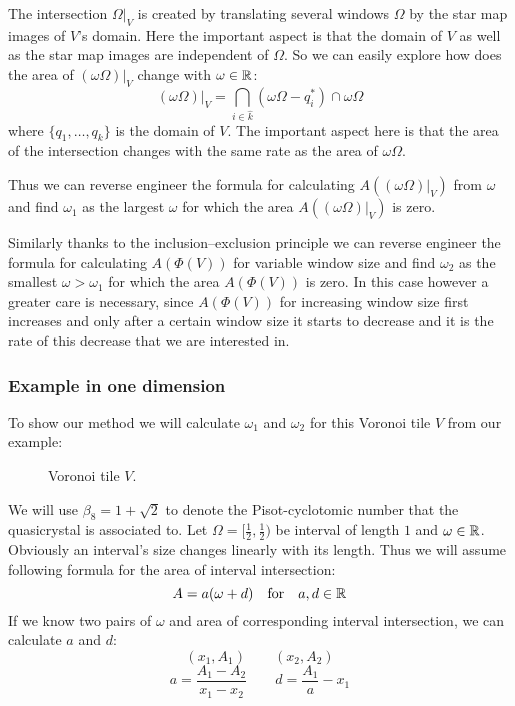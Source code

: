 \documentclass[text.tex]{subfiles}
\begin{document}
The intersection $\Omega|_V$ is created by translating several windows $\Omega$ by the star map images of $V$'s domain. Here the important aspect is that the domain of $V$ as well as the star map images are independent of $\Omega$. So we can easily explore how does the area of $(\omega\Omega)|_V$ change with $\omega\in\mathbb{R}$:
$$(\omega\Omega)|_V = \bigcap\limits_{i\in\hat{k}}(\omega\Omega-q_i^\ast)\cap\omega\Omega$$
where $\{q_1,\dots,q_k\}$ is the domain of $V$. The important aspect here is that the area of the intersection changes with the same rate as the area of $\omega\Omega$. 

Thus we can reverse engineer the formula for calculating $A((\omega\Omega)|_V)$ from $\omega$ and find $\omega_1$ as the largest $\omega$ for which the area $A((\omega\Omega)|_V)$ is zero. 

Similarly thanks to the inclusion--exclusion principle we can reverse engineer the formula for calculating $A(\Phi(V))$ for variable window size and find $\omega_2$ as the smallest $\omega>\omega_1$ for which the area $A(\Phi(V))$ is zero. In this case however a greater care is necessary, since $A(\Phi(V))$ for increasing window size first increases and only after a certain window size it starts to decrease and it is the rate of this decrease that we are interested in. 

\subsubsection{Example in one dimension}
To show our method we will calculate $\omega_1$ and $\omega_2$ for this Voronoi tile $V$ from our example: 
\begin{figure}[h!]
\centering
\caption{Voronoi tile $V$.}
\label{fig_calculatingPeriodExample01}
\end{figure}

We will use $\beta_8 = 1+\sqrt{2}$ to denote the Pisot-cyclotomic number that the quasicrystal is associated to. 
Let $\Omega = [\frac{1}{2}, \frac{1}{2})$ be interval of length $1$ and $\omega\in\mathbb{R}$. Obviously an interval's size changes linearly with its length. Thus we will assume following formula for the area of interval intersection: 
$$A = a(\omega+d) \quad\text{for}\quad a,d\in\mathbb{R}$$
If we know two pairs of $\omega$ and area of corresponding interval intersection, we can calculate $a$ and $d$:
$$(x_1,A_1) \qquad (x_2,A_2)$$
$$a = \frac{A_1-A_2}{x_1-x_2} \qquad d=\frac{A_1}{a}-x_1$$
\end{document}
